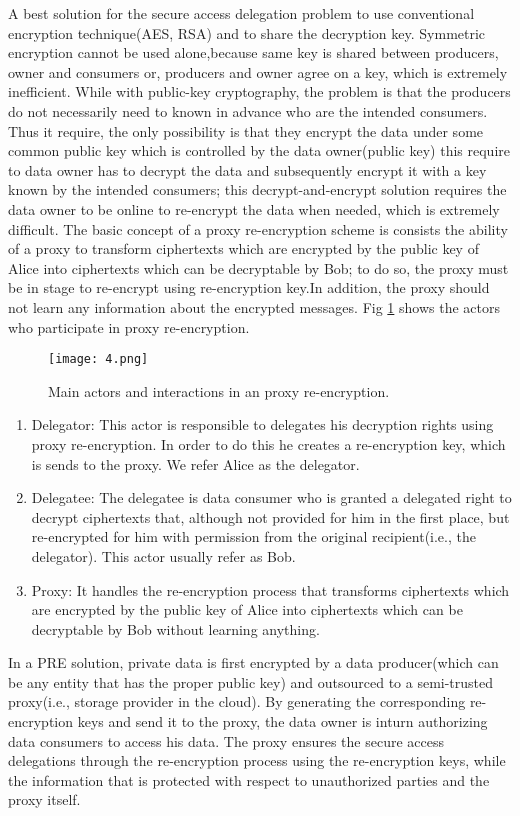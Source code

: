 \documentclass[10pt,a4paper,journal]{IEEEtran}
\begin{document}
\hspace{2em}A best solution for the secure access delegation problem to use conventional encryption technique(AES, RSA) and to share the decryption key. Symmetric encryption cannot be used alone,because same key is shared between producers, owner and consumers or, producers and owner agree on a key, which is extremely inefficient. While with public-key cryptography, the problem is that the producers do not necessarily  need to known in advance who are the intended consumers. Thus it require, the only possibility is that they encrypt the data under some common public key which is  controlled by the data owner(public key) this require to data owner has to decrypt the data and subsequently encrypt it with a key known by the intended consumers; this decrypt-and-encrypt solution requires the data owner to be online to re-encrypt the data when needed, which is extremely difficult.
The basic concept of a proxy re-encryption\cite{4} scheme is consists the ability of a proxy to transform ciphertexts which are encrypted by the public key of Alice into ciphertexts  which can be decryptable by Bob; to do so, the proxy must be in stage to re-encrypt using re-encryption key\cite{13}.In addition, the proxy should not learn any information about the encrypted messages. Fig \ref{Figure 4:} shows the actors who participate in proxy re-encryption.
\begin{figure}[hbtp]
\centering
\texttt{[image: 4.png]}
\caption{Main actors and interactions in an proxy re-encryption\cite{4}.}
\label{Figure 4:}
\end{figure}
\begin{enumerate}
\item Delegator: This actor is responsible to delegates his decryption rights using proxy re-encryption. In order to do this he creates a re-encryption key, which is sends to the proxy. We refer Alice as the delegator.
\item Delegatee: The delegatee is data consumer who is granted a delegated right to decrypt ciphertexts that, although not provided for him in the first place, but re-encrypted for him with permission from the original recipient(i.e., the delegator). This actor usually refer as Bob.
\item Proxy: It handles the re-encryption process that transforms ciphertexts which are encrypted by the public key of Alice into ciphertexts  which can be decryptable by Bob without learning anything.
\end{enumerate}
\hspace{2em}In a PRE solution\cite{6}, private data is first encrypted by a data producer(which can be any entity that has the proper public key) and outsourced to a semi-trusted proxy(i.e., storage provider in the cloud). By generating the corresponding re-encryption keys and send it to the proxy, the data owner is inturn authorizing data consumers to access his data. The proxy ensures the secure access delegations through the re-encryption process using the re-encryption keys, while the information that is protected  with respect to unauthorized parties and the proxy itself\cite{12}.
\end{document}
